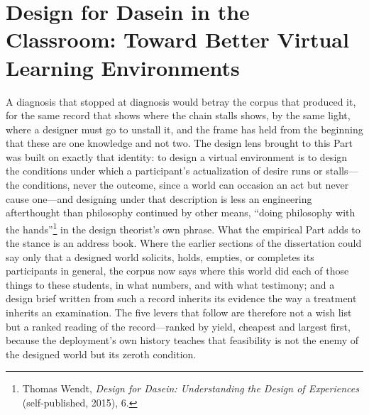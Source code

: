 \documentclass{article}
\begin{document}
\section{Design for Dasein in the Classroom: Toward Better Virtual Learning Environments}

A diagnosis that stopped at diagnosis would betray the corpus that produced it, for the same record that shows where the chain stalls shows, by the same light, where a designer must go to unstall it, and the frame has held from the beginning that these are one knowledge and not two. The design lens brought to this Part was built on exactly that identity: to design a virtual environment is to design the conditions under which a participant's actualization of desire runs or stalls---the conditions, never the outcome, since a world can occasion an act but never cause one---and designing under that description is less an engineering afterthought than philosophy continued by other means, ``doing philosophy with the hands''\footnote{Thomas Wendt, \textit{Design for Dasein: Understanding the Design of Experiences} (self-published, 2015), 6.} in the design theorist's own phrase. What the empirical Part adds to the stance is an address book. Where the earlier sections of the dissertation could say only that a designed world solicits, holds, empties, or completes its participants in general, the corpus now says where this world did each of those things to these students, in what numbers, and with what testimony; and a design brief written from such a record inherits its evidence the way a treatment inherits an examination. The five levers that follow are therefore not a wish list but a ranked reading of the record---ranked by yield, cheapest and largest first, because the deployment's own history teaches that feasibility is not the enemy of the designed world but its zeroth condition.
\end{document}
